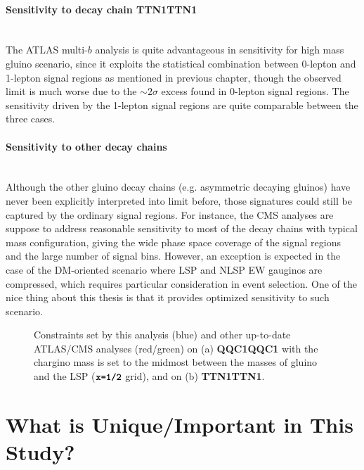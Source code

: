 \paragraph{Sensitivity to decay chain \textbf{TTN1TTN1}} \mbox{} \\
The ATLAS multi-$b$ analysis \cite{ATLAS_SUSY_strong3B} is quite advantageous in sensitivity for high mass gluino scenario, since it exploits the statistical combination between 0-lepton and 1-lepton signal regions as mentioned in previous chapter,
though the observed limit is much worse due to the $\sim 2\sigma$ excess found in 0-lepton signal regions.
The sensitivity driven by the 1-lepton signal regions are quite comparable between the three cases.



\paragraph{Sensitivity to other decay chains} \mbox{} \\
Although the other gluino decay chains (e.g. asymmetric decaying gluinos) have never been explicitly interpreted into limit before,
those signatures could still be captured by the ordinary signal regions. 
For instance, the CMS analyses are suppose to address reasonable sensitivity to most of the decay chains with typical mass configuration,
giving the wide phase space coverage of the signal regions and the large number of signal bins.
However, an exception is expected in the case of the DM-oriented scenario where LSP and NLSP EW gauginos are compressed, 
which requires particular consideration in event selection.
One of the nice thing about this thesis is that it provides optimized sensitivity to such scenario. \\

\begin{figure}
  \centering
    \caption{Constraints set by this analysis (blue) and other up-to-date ATLAS/CMS analyses (red/green) on (a) \textbf{QQC1QQC1} with the chargino mass is set to the midmost between the masses of gluino and the LSP ($\mathrm{\textbf{\texttt{x=1/2}}}$ grid), and on (b) \textbf{TTN1TTN1}.}
    \label{fig::Discussion::LHCLimitGG}
\end{figure}



\section{What is Unique/Important in This Study?}
